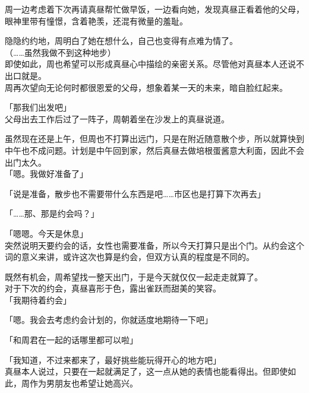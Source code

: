 周一边考虑着下次再请真昼帮忙做早饭，一边看向她，发现真昼正看着他的父母，眼神里带有憧憬，含着艳羡，还混有微量的羞耻。

隐隐约约地，周明白了她在想什么，自己也变得有点难为情了。\\

（……虽然我做不到这种地步）\\

即使如此，周也希望可以形成真昼心中描绘的亲密关系。尽管他对真昼本人还说不出口就是。\\

周再次望向无论何时都很恩爱的父母，想象着某一天的未来，暗自脸红起来。\\

\vspace{2\baselineskip}

「那我们出发吧」\\

父母出去工作后过了一阵子，周朝着坐在沙发上的真昼说道。

虽然现在还是上午，但周也不打算出远门，只是在附近随意散个步，所以就算快到中午也不成问题。计划是中午回到家，然后真昼去做培根蛋酱意大利面，因此不会出门太久。\\

「嗯。我做好准备了」

「说是准备，散步也不需要带什么东西是吧……市区也是打算下次再去」

「……那、那是约会吗？」

「嗯嗯。今天是休息」\\

突然说明天要约会的话，女性也需要准备，所以今天打算只是出个门。从约会这个词的意义来讲，或许这次也算是约会，但双方认真的程度是不同的。

既然有机会，周希望找一整天出门，于是今天就仅仅一起走走就算了。\\

对于下次的约会，真昼喜形于色，露出雀跃而甜美的笑容。\\

「我期待着约会」

「嗯。我会去考虑约会计划的，你就适度地期待一下吧」

「和周君在一起的话哪里都可以啦」

「我知道，不过来都来了，最好挑些能玩得开心的地方吧」\\

真昼本人说过，只要在一起就满足了，这一点从她的表情也能看得出。但即使如此，周作为男朋友也希望让她高兴。\\

